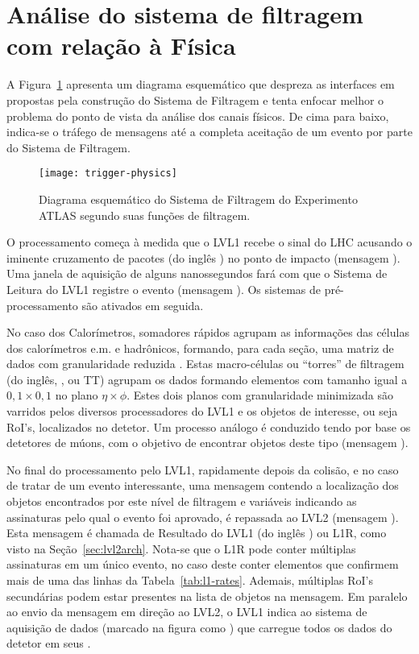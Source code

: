 \section{Análise do sistema de filtragem com relação à Física}

A Figura~\ref{fig:trigger-physics} apresenta um diagrama esquemático que
despreza as interfaces em  propostas pela construção do Sistema
de Filtragem e tenta enfocar melhor o problema do ponto de vista da análise
dos canais físicos. De cima para baixo, indica-se o tráfego de mensagens até a
completa aceitação de um evento por parte do Sistema de Filtragem.

\begin{figure}
\begin{center}
\texttt{[image: trigger-physics]}
\end{center}
\caption{Diagrama esquemático do Sistema de Filtragem do Experimento ATLAS
segundo suas funções de filtragem.}
\label{fig:trigger-physics}
\end{figure}

O processamento começa à medida que o LVL1 recebe o sinal do LHC acusando o
iminente cruzamento de pacotes (do inglês ) no ponto de
impacto (mensagem ). Uma janela de aquisição de alguns nanossegundos
fará com que o Sistema de Leitura do LVL1 registre o evento (mensagem
). Os sistemas de pré-processamento são ativados em seguida.

No caso dos Calorímetros, somadores rápidos \cite{seixas:adder} agrupam as
informações das células dos calorímetros e.m. e hadrônicos, formando, para
cada seção, uma matriz de dados com granularidade reduzida
\cite{l1-tdr}. Estas macro-células ou ``torres'' de filtragem (do inglês,
, ou TT) agrupam os dados formando elementos com tamanho
igual a $0,1\times0,1$ no plano $\eta\times\phi$. Estes dois planos com
granularidade minimizada são varridos pelos diversos processadores do LVL1 e
os objetos de interesse, ou seja RoI's, localizados no detetor. Um processo
análogo é conduzido tendo por base os detetores de múons, com o objetivo de
encontrar objetos deste tipo (mensagem ).

No final do processamento pelo LVL1, rapidamente depois da colisão, e no caso
de tratar de um evento interessante, uma mensagem contendo a localização dos
objetos encontrados por este nível de filtragem e variáveis indicando as
assinaturas pelo qual o evento foi aprovado, é repassada ao LVL2
(mensagem ). Esta mensagem é chamada de Resultado do LVL1 (do inglês
) ou L1R, como visto na Seção~\ref{sec:lvl2arch}. Nota-se que
o L1R pode conter múltiplas assinaturas em um único evento, no caso deste
conter elementos que confirmem mais de uma das linhas da
Tabela~\ref{tab:l1-rates}. Ademais, múltiplas RoI's secundárias podem estar
presentes na lista de objetos na mensagem. Em paralelo ao envio da mensagem em
direção ao LVL2, o LVL1 indica ao sistema de aquisição de dados (marcado na
figura como ) que carregue todos os dados do detetor em seus
.

